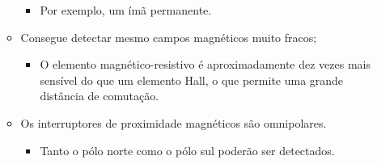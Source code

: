 \documentclass[xcolor=dvipsnames, aspectratio=169]{beamer}
\begin{document}
\begin{frame}
\begin{itemize}
\begin{itemize}
			\begin{itemize}
				\item Por exemplo, um ímã permanente.
			\end{itemize} 
			\item Consegue detectar mesmo campos magnéticos muito fracos;
			\begin{itemize}
				\item O elemento magnético-resistivo é aproximadamente dez vezes mais sensível do que um elemento Hall, o que permite uma grande distância de comutação.
			\end{itemize}
			\item Os interruptores de proximidade magnéticos são omnipolares.
			\begin{itemize}
				\item Tanto o pólo norte como o pólo sul poderão ser detectados.
			\end{itemize}
		\end{itemize}
	\end{itemize}
\end{frame}


\end{document}

